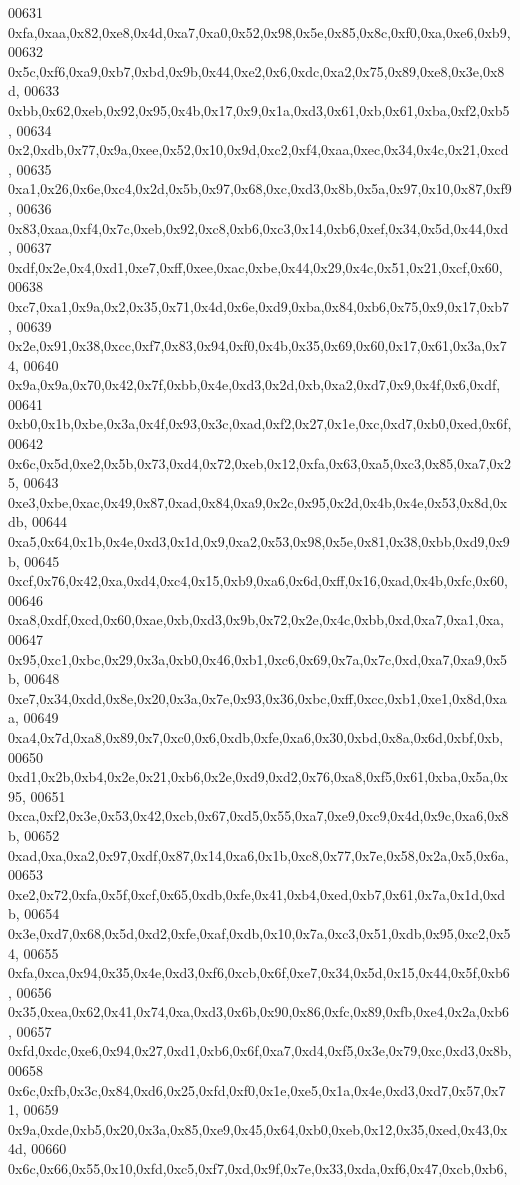 \begin{DoxyCode}
00631   0xfa,0xaa,0x82,0xe8,0x4d,0xa7,0xa0,0x52,0x98,0x5e,0x85,0x8c,0xf0,0xa,0xe6,0xb9,
00632   0x5c,0xf6,0xa9,0xb7,0xbd,0x9b,0x44,0xe2,0x6,0xdc,0xa2,0x75,0x89,0xe8,0x3e,0x8d,
00633   0xbb,0x62,0xeb,0x92,0x95,0x4b,0x17,0x9,0x1a,0xd3,0x61,0xb,0x61,0xba,0xf2,0xb5,
00634   0x2,0xdb,0x77,0x9a,0xee,0x52,0x10,0x9d,0xc2,0xf4,0xaa,0xec,0x34,0x4c,0x21,0xcd,
00635   0xa1,0x26,0x6e,0xc4,0x2d,0x5b,0x97,0x68,0xc,0xd3,0x8b,0x5a,0x97,0x10,0x87,0xf9,
00636   0x83,0xaa,0xf4,0x7c,0xeb,0x92,0xc8,0xb6,0xc3,0x14,0xb6,0xef,0x34,0x5d,0x44,0xd,
00637   0xdf,0x2e,0x4,0xd1,0xe7,0xff,0xee,0xac,0xbe,0x44,0x29,0x4c,0x51,0x21,0xcf,0x60,
00638   0xc7,0xa1,0x9a,0x2,0x35,0x71,0x4d,0x6e,0xd9,0xba,0x84,0xb6,0x75,0x9,0x17,0xb7,
00639   0x2e,0x91,0x38,0xcc,0xf7,0x83,0x94,0xf0,0x4b,0x35,0x69,0x60,0x17,0x61,0x3a,0x74,
00640   0x9a,0x9a,0x70,0x42,0x7f,0xbb,0x4e,0xd3,0x2d,0xb,0xa2,0xd7,0x9,0x4f,0x6,0xdf,
00641   0xb0,0x1b,0xbe,0x3a,0x4f,0x93,0x3c,0xad,0xf2,0x27,0x1e,0xc,0xd7,0xb0,0xed,0x6f,
00642   0x6c,0x5d,0xe2,0x5b,0x73,0xd4,0x72,0xeb,0x12,0xfa,0x63,0xa5,0xc3,0x85,0xa7,0x25,
00643   0xe3,0xbe,0xac,0x49,0x87,0xad,0x84,0xa9,0x2c,0x95,0x2d,0x4b,0x4e,0x53,0x8d,0xdb,
00644   0xa5,0x64,0x1b,0x4e,0xd3,0x1d,0x9,0xa2,0x53,0x98,0x5e,0x81,0x38,0xbb,0xd9,0x9b,
00645   0xcf,0x76,0x42,0xa,0xd4,0xc4,0x15,0xb9,0xa6,0x6d,0xff,0x16,0xad,0x4b,0xfc,0x60,
00646   0xa8,0xdf,0xcd,0x60,0xae,0xb,0xd3,0x9b,0x72,0x2e,0x4c,0xbb,0xd,0xa7,0xa1,0xa,
00647   0x95,0xc1,0xbc,0x29,0x3a,0xb0,0x46,0xb1,0xc6,0x69,0x7a,0x7c,0xd,0xa7,0xa9,0x5b,
00648   0xe7,0x34,0xdd,0x8e,0x20,0x3a,0x7e,0x93,0x36,0xbc,0xff,0xcc,0xb1,0xe1,0x8d,0xaa,
00649   0xa4,0x7d,0xa8,0x89,0x7,0xc0,0x6,0xdb,0xfe,0xa6,0x30,0xbd,0x8a,0x6d,0xbf,0xb,
00650   0xd1,0x2b,0xb4,0x2e,0x21,0xb6,0x2e,0xd9,0xd2,0x76,0xa8,0xf5,0x61,0xba,0x5a,0x95,
00651   0xca,0xf2,0x3e,0x53,0x42,0xcb,0x67,0xd5,0x55,0xa7,0xe9,0xc9,0x4d,0x9c,0xa6,0x8b,
00652   0xad,0xa,0xa2,0x97,0xdf,0x87,0x14,0xa6,0x1b,0xc8,0x77,0x7e,0x58,0x2a,0x5,0x6a,
00653   0xe2,0x72,0xfa,0x5f,0xcf,0x65,0xdb,0xfe,0x41,0xb4,0xed,0xb7,0x61,0x7a,0x1d,0xdb,
00654   0x3e,0xd7,0x68,0x5d,0xd2,0xfe,0xaf,0xdb,0x10,0x7a,0xc3,0x51,0xdb,0x95,0xc2,0x54,
00655   0xfa,0xca,0x94,0x35,0x4e,0xd3,0xf6,0xcb,0x6f,0xe7,0x34,0x5d,0x15,0x44,0x5f,0xb6,
00656   0x35,0xea,0x62,0x41,0x74,0xa,0xd3,0x6b,0x90,0x86,0xfc,0x89,0xfb,0xe4,0x2a,0xb6,
00657   0xfd,0xdc,0xe6,0x94,0x27,0xd1,0xb6,0x6f,0xa7,0xd4,0xf5,0x3e,0x79,0xc,0xd3,0x8b,
00658   0x6c,0xfb,0x3c,0x84,0xd6,0x25,0xfd,0xf0,0x1e,0xe5,0x1a,0x4e,0xd3,0xd7,0x57,0x71,
00659   0x9a,0xde,0xb5,0x20,0x3a,0x85,0xe9,0x45,0x64,0xb0,0xeb,0x12,0x35,0xed,0x43,0x4d,
00660   0x6c,0x66,0x55,0x10,0xfd,0xc5,0xf7,0xd,0x9f,0x7e,0x33,0xda,0xf6,0x47,0xcb,0xb6,

\end{DoxyCode}
